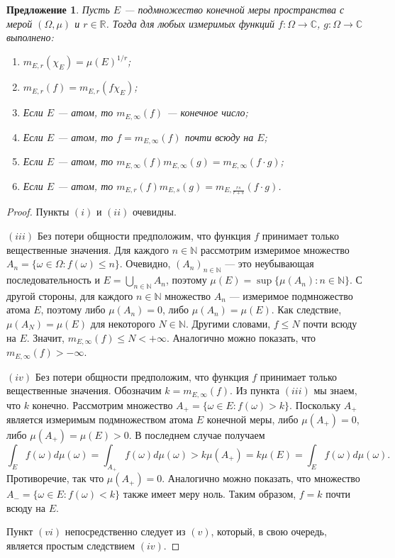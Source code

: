 \documentclass[12pt]{article}
\newtheorem{proposition}[theorem]{Предложение}
\begin{document}
\begin{proposition}\label{GnrlzdMeanProp}
    Пусть $E$ --- подмножество конечной меры пространства с мерой $(\Omega,\mu)$ 
    и $r\in\mathbb{R}$. Тогда для любых измеримых 
    функций $f:\Omega\to\mathbb{C}$, $g:\Omega\to\mathbb{C}$ выполнено:
    \begin{enumerate}[label = (\roman*)]
        \item $m_{E,r}(\chi_E)=\mu(E)^{1/r}$;
        \item $m_{E,r}(f)=m_{E,r}(f\chi_E)$;
        \item Если $E$ --- атом, то $m_{E,\infty}(f)$ --- конечное число;
        \item Если $E$ --- атом, то $f=m_{E,\infty}(f)$ почти всюду на $E$;
        \item Если $E$ --- атом, 
        то $m_{E,\infty}(f)m_{E,\infty}(g)=m_{E,\infty}(f\cdot g)$;
        \item Если $E$ --- атом, 
        то $m_{E,r}(f)m_{E,s}(g)=m_{E,\frac{rs}{r+s}}(f\cdot g)$.
    \end{enumerate}
\end{proposition}
\begin{proof}
    Пункты $(i)$ и $(ii)$ очевидны.

    $(iii)$ Без потери общности предположим, что функция $f$ принимает только 
    вещественные значения. Для каждого $n\in\mathbb{N}$ рассмотрим измеримое 
    множество $A_n=\{\omega\in\Omega:f(\omega)\leq n\}$. Очевидно, 
    $(A_n)_{n\in\mathbb{N}}$ --- это неубывающая последовательность
    и $E=\bigcup_{n\in\mathbb{N}}A_n$, 
    поэтому $\mu(E)=\sup\{\mu(A_n):n\in\mathbb{N}\}$. С другой стороны, для 
    каждого $n\in\mathbb{N}$ множество $A_n$ --- измеримое подмножество 
    атома $E$, поэтому либо $\mu(A_n)=0$, либо $\mu(A_n)=\mu(E)$. 
    Как следствие, $\mu(A_N)=\mu(E)$ для некоторого $N\in\mathbb{N}$. 
    Другими словами, $f\leq N$ почти всюду на $E$.
    Значит, $m_{E,\infty}(f)\leq N<+\infty$. Аналогично можно показать, 
    что $m_{E,\infty}(f)>-\infty$.

    $(iv)$ Без потери общности предположим, что функция $f$ принимает только 
    вещественные значения. Обозначим $k=m_{E,\infty}(f)$. Из пункта $(iii)$ мы 
    знаем, что $k$ конечно. Рассмотрим 
    множество $A_+=\{\omega\in E: f(\omega)>k\}$. Поскольку $A_+$ является 
    измеримым подмножеством атома $E$ конечной меры, либо $\mu(A_+)=0$, 
    либо $\mu(A_+)=\mu(E)>0$. В последнем случае получаем
    \[
        \int_E f(\omega)d\mu(\omega)
        =\int_{A_+}f(\omega)d\mu(\omega)
        >k\mu(A_+)
        =k\mu(E)
        =\int_E f(\omega)d\mu(\omega).
    \]
    Противоречие, так что $\mu(A_+)=0$. Аналогично можно показать, что 
    множество $A_-=\{\omega\in E:f(\omega)<k\}$ также имеет меру ноль. 
    Таким образом, $f=k$ почти всюду на $E$.

    Пункт $(vi)$ непосредственно следует из $(v)$, который, в свою очередь, 
    является простым следствием $(iv)$.
\end{proof}
\end{document}
